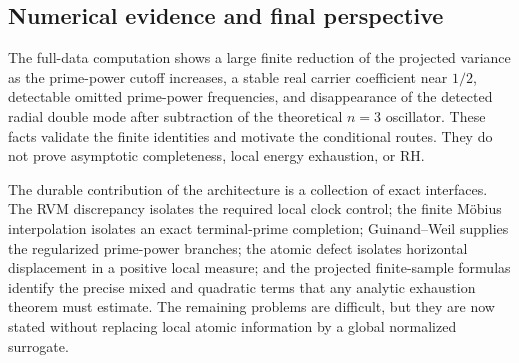 \documentclass[11pt]{amsart}
\numberwithin{equation}{section}
\theoremstyle{plain}
\theoremstyle{definition}
\theoremstyle{remark}
\newcommand{\1}{\mathbf{1}}
\begin{document}
\subsection{Numerical evidence and final perspective}
\label{subsec:conclusion_numerical}

The full-data computation shows a large finite reduction of the projected
variance as the prime-power cutoff increases, a stable real carrier
coefficient near $1/2$, detectable omitted prime-power frequencies, and
disappearance of the detected radial double mode after subtraction of the
theoretical $n=3$ oscillator. These facts validate the finite identities and
motivate the conditional routes. They do not prove asymptotic completeness,
local energy exhaustion, or RH.

The durable contribution of the architecture is a collection of exact
interfaces. The RVM discrepancy isolates the required local clock control;
the finite Möbius interpolation isolates an exact terminal-prime completion;
Guinand--Weil supplies the regularized prime-power branches; the atomic defect
isolates horizontal displacement in a positive local measure; and the
projected finite-sample formulas identify the precise mixed and quadratic
terms that any analytic exhaustion theorem must estimate. The remaining
problems are difficult, but they are now stated without replacing local
atomic information by a global normalized surrogate.
\end{document}
